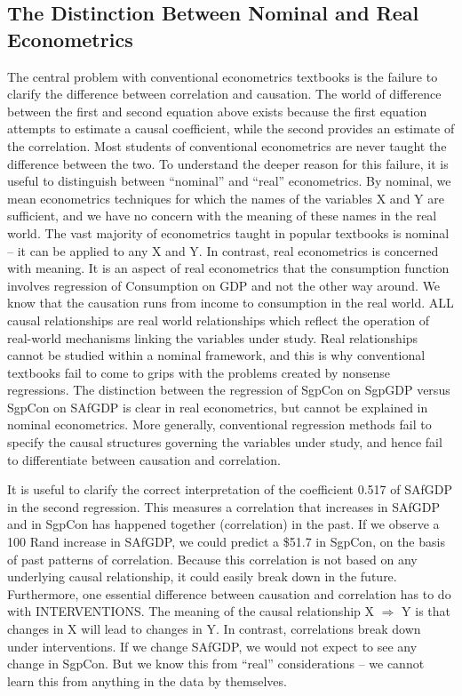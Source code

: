 \documentclass[
  letterpaper,
  DIV=11,
  numbers=noendperiod]{scrartcl}
\begin{document}
\hypertarget{the-distinction-between-nominal-and-real-econometrics}{%
\subsection{The Distinction Between Nominal and Real
Econometrics}\label{the-distinction-between-nominal-and-real-econometrics}}

The central problem with conventional econometrics textbooks is the
failure to clarify the difference between correlation and causation. The
world of difference between the first and second equation above exists
because the first equation attempts to estimate a causal coefficient,
while the second provides an estimate of the correlation. Most students
of conventional econometrics are never taught the difference between the
two. To understand the deeper reason for this failure, it is useful to
distinguish between ``nominal'' and ``real'' econometrics. By nominal,
we mean econometrics techniques for which the names of the variables X
and Y are sufficient, and we have no concern with the meaning of these
names in the real world. The vast majority of econometrics taught in
popular textbooks is nominal -- it can be applied to any X and Y. In
contrast, real econometrics is concerned with meaning. It is an aspect
of real econometrics that the consumption function involves regression
of Consumption on GDP and not the other way around. We know that the
causation runs from income to consumption in the real world. ALL causal
relationships are real world relationships which reflect the operation
of real-world mechanisms linking the variables under study. Real
relationships cannot be studied within a nominal framework, and this is
why conventional textbooks fail to come to grips with the problems
created by nonsense regressions. The distinction between the regression
of SgpCon on SgpGDP versus SgpCon on SAfGDP is clear in real
econometrics, but cannot be explained in nominal econometrics. More
generally, conventional regression methods fail to specify the causal
structures governing the variables under study, and hence fail to
differentiate between causation and correlation.

It is useful to clarify the correct interpretation of the coefficient
0.517 of SAfGDP in the second regression. This measures a correlation
that increases in SAfGDP and in SgpCon has happened together
(correlation) in the past. If we observe a 100 Rand increase in SAfGDP,
we could predict a \$51.7 in SgpCon, on the basis of past patterns of
correlation. Because this correlation is not based on any underlying
causal relationship, it could easily break down in the future.
Furthermore, one essential difference between causation and correlation
has to do with INTERVENTIONS. The meaning of the causal relationship X
\(\Rightarrow\) Y is that changes in X will lead to changes in Y. In
contrast, correlations break down under interventions. If we change
SAfGDP, we would not expect to see any change in SgpCon. But we know
this from ``real'' considerations -- we cannot learn this from anything
in the data by themselves.
\end{document}
